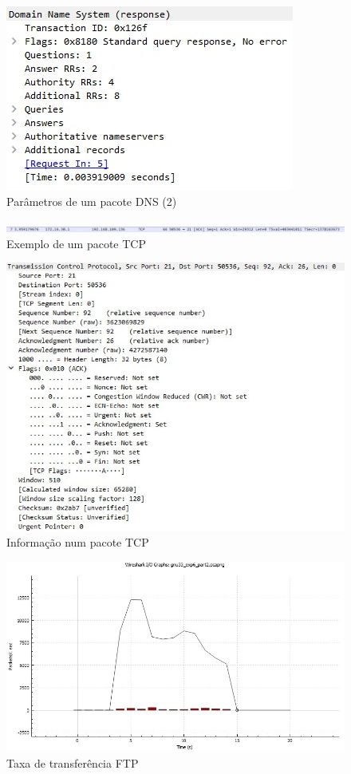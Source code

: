 \documentclass[article, a4paper, 11pt, oneside]{memoir}
\begin{document}
\begin{figure}[htbp]  \label{exp5-dns-response}
  \centering        
  \includegraphics[scale=0.8]{img/exp5-dns-response.jpg}
  \caption{Parâmetros de um pacote DNS (2)}
\end{figure}

\begin{figure}[htbp]  \label{exp6-tcp}
  \centering        
  \includegraphics[scale=0.6]{img/exp6-tcp.jpg}
  \caption{Exemplo de um pacote TCP}
\end{figure}

\begin{figure}[htbp]  \label{exp6-info}
  \centering        
  \includegraphics[scale=0.8]{img/exp6-info.jpg}
  \caption{Informação num pacote TCP}
\end{figure}

\begin{figure}[htbp]  \label{exp6-6}
  \centering        
  \includegraphics[scale=0.7]{img/exp6-6.jpg}
  \caption{Taxa de transferência FTP}
\end{figure}
\end{document}
